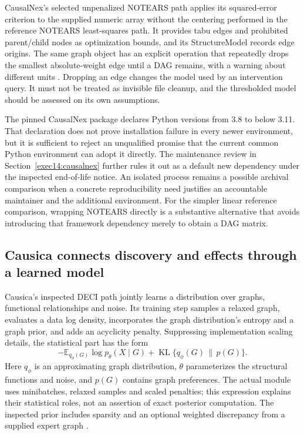 CausalNex's selected unpenalized NOTEARS path applies its squared-error
criterion to the supplied numeric array without the centering performed in the
reference NOTEARS least-squares path. It provides tabu edges and prohibited
parent/child nodes as optimization bounds, and its StructureModel records edge
origins. The same graph object has an explicit operation that repeatedly drops
the smallest absolute-weight edge until a DAG remains, with a warning about
different units \citep{exec13_pydisc_causalnex}. Dropping an edge changes the
model used by an intervention query. It must not be treated as invisible file
cleanup, and the thresholded model should be assessed on its own assumptions.

The pinned CausalNex package declares Python versions from 3.8 to below 3.11.
That declaration does not prove installation failure in every newer
environment, but it is sufficient to reject an unqualified promise that the
current common Python environment can adopt it directly. The maintenance
review in Section~\ref{exec14:causalnex} further rules it out as a default new
dependency under the inspected end-of-life notice. An isolated process remains
a possible archival comparison when a concrete reproducibility need justifies
an accountable maintainer and the additional environment. For the simpler
linear reference comparison, wrapping NOTEARS directly is a substantive
alternative that avoids introducing that framework dependency merely to
obtain a DAG matrix.

\subsection{Causica connects discovery and effects through a learned model}

Causica's inspected DECI path jointly learns a distribution over graphs,
functional relationships and noise. Its training step samples a relaxed graph,
evaluates a data log density, incorporates the graph distribution's entropy
and a graph prior, and adds an acyclicity penalty. Suppressing implementation
scaling details, the statistical part has the form
\begin{equation}
 -\mathbb E_{q_\phi(G)}\log p_\theta(X\mid G)
 +\operatorname{KL}\{q_\phi(G)\,\|\,p(G)\}.
\end{equation}
Here \(q_\phi\) is an approximating graph distribution, \(\theta\) parameterizes
the structural functions and noise, and \(p(G)\) contains graph preferences.
The actual module uses minibatches, relaxed samples and scaled penalties;
this expression explains their statistical roles, not an assertion of exact
posterior computation. The inspected prior includes sparsity and an optional
weighted discrepancy from a supplied expert graph
\citep{exec13_pydisc_causica}.


